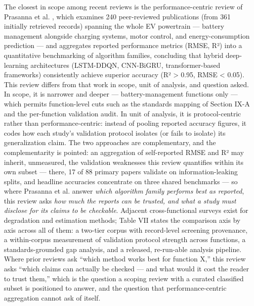 \documentclass[journal]{IEEEtran}
\begin{document}
The closest in scope among recent reviews is the performance-centric review of Prasanna et al. \cite{r27}, which examines 240 peer-reviewed publications (from 361 initially retrieved records) spanning the whole EV powertrain --- battery management alongside charging systems, motor control, and energy-consumption prediction --- and aggregates reported performance metrics (RMSE, R²) into a quantitative benchmarking of algorithm families, concluding that hybrid deep-learning architectures (LSTM-DDQN, CNN-BiGRU, transformer-based frameworks) consistently achieve superior accuracy (R² > 0.95, RMSE < 0.05). This review differs from that work in scope, unit of analysis, and question asked. In scope, it is narrower and deeper --- battery-management functions only --- which permits function-level cuts such as the standards mapping of Section IX-A and the per-function validation audit. In unit of analysis, it is protocol-centric rather than performance-centric: instead of pooling reported accuracy figures, it codes how each study's validation protocol isolates (or fails to isolate) its generalization claim. The two approaches are complementary, and the complementarity is pointed: an aggregation of self-reported RMSE and R² may inherit, unmeasured, the validation weaknesses this review quantifies within its own subset --- there, 17 of 88 primary papers validate on information-leaking splits, and headline accuracies concentrate on three shared benchmarks --- so where Prasanna et al. answer \textit{which algorithm family performs best as reported}, this review asks \textit{how much the reports can be trusted, and what a study must disclose for its claims to be checkable}. Adjacent cross-functional surveys exist for degradation and estimation methods; Table VII states the comparison axis by axis across all of them: a two-tier corpus with record-level screening provenance, a within-corpus measurement of validation protocol strength across functions, a standards-grounded gap analysis, and a released, re-run-able analysis pipeline. Where prior reviews ask ``which method works best for function X,'' this review asks ``which claims can actually be checked --- and what would it cost the reader to trust them,'' which is the question a scoping review with a curated classified subset is positioned to answer, and the question that performance-centric aggregation cannot ask of itself.
\end{document}

